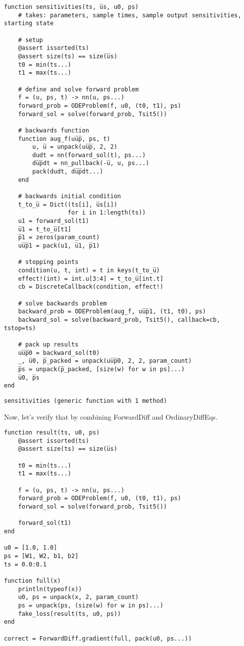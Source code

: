 \documentclass[11pt]{article}
\begin{document}
\begin{verbatim}
function sensitivities(ts, u̅s, u0, ps)
    # takes: parameters, sample times, sample output sensitivities, starting state

    # setup
    @assert issorted(ts)
    @assert size(ts) == size(u̅s)
    t0 = min(ts...)
    t1 = max(ts...)

    # define and solve forward problem
    f = (u, ps, t) -> nn(u, ps...)
    forward_prob = ODEProblem(f, u0, (t0, t1), ps)
    forward_sol = solve(forward_prob, Tsit5())

    # backwards function
    function aug_f(uu̅p̅, ps, t)
        u, u̅ = unpack(uu̅p̅, 2, 2)
        dudt = nn(forward_sol(t), ps...)
        du̅p̅dt = nn_pullback(-u̅, u, ps...)
        pack(dudt, du̅p̅dt...)
    end

    # backwards initial condition
    t_to_u̅ = Dict((ts[i], u̅s[i])
                  for i in 1:length(ts))
    u1 = forward_sol(t1)
    u̅1 = t_to_u̅[t1]
    p̅1 = zeros(param_count)
    uu̅p̅1 = pack(u1, u̅1, p̅1)

    # stopping points
    condition(u, t, int) = t in keys(t_to_u̅)
    effect!(int) = int.u[3:4] = t_to_u̅[int.t]
    cb = DiscreteCallback(condition, effect!)

    # solve backwards problem
    backward_prob = ODEProblem(aug_f, uu̅p̅1, (t1, t0), ps)
    backward_sol = solve(backward_prob, Tsit5(), callback=cb, tstop=ts)

    # pack up results
    uu̅p̅0 = backward_sol(t0)
    _, u̅0, p̅_packed = unpack(uu̅p̅0, 2, 2, param_count)
    p̅s = unpack(p̅_packed, [size(w) for w in ps]...)
    u̅0, p̅s
end
\end{verbatim}

\begin{verbatim}
sensitivities (generic function with 1 method)
\end{verbatim}


Now, let's verify that by combining ForwardDiff and OrdinaryDiffEqs.

\begin{verbatim}
function result(ts, u0, ps)
    @assert issorted(ts)
    @assert size(ts) == size(u̅s)

    t0 = min(ts...)
    t1 = max(ts...)

    f = (u, ps, t) -> nn(u, ps...)
    forward_prob = ODEProblem(f, u0, (t0, t1), ps)
    forward_sol = solve(forward_prob, Tsit5())

    forward_sol(t1)
end

u0 = [1.0, 1.0]
ps = [W1, W2, b1, b2]
ts = 0.0:0.1

function full(x)
    println(typeof(x))
    u0, ps = unpack(x, 2, param_count)
    ps = unpack(ps, (size(w) for w in ps)...)
    fake_loss(result(ts, u0, ps))
end

correct = ForwardDiff.gradient(full, pack(u0, ps...))

\end{verbatim}
\end{document}
